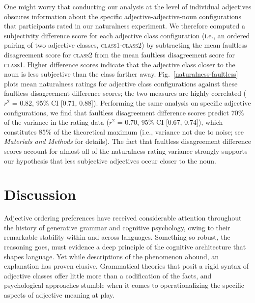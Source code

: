 \documentclass{pnastwo}
\begin{document}
\begin{article}
One might worry that conducting our analysis at the level of individual adjectives obscures information about the specific adjective-adjective-noun configurations that participants rated in our naturalness experiment.
We therefore computed a subjectivity difference score for each adjective class configuration (i.e., an ordered pairing of two adjective classes, \textsc{class1}-\textsc{class2}) by subtracting the mean faultless disagreement score for \textsc{class2} from the mean faultless disagreement score for \textsc{class1}. Higher difference scores indicate that the adjective class closer to the noun is less subjective than the class farther away. Fig.~\ref{naturalness-faultless} plots mean naturalness ratings for adjective class configurations against these faultless disagreement difference scores; the two measures are highly correlated ($r^2$ = 0.82, 95\% CI [0.71, 0.88]). Performing the same analysis on specific adjective configurations, we find that faultless disagreement difference scores predict 70\% of the variance in the rating data ($r^2$ = 0.70, 95\% CI [0.67, 0.74]), which constitutes 85\% of the theoretical maximum (i.e., variance not due to noise; see \emph{Materials and Methods} for details). The fact that faultless disagreement difference scores account for almost all of the naturalness rating variance strongly supports our hypothesis that less subjective adjectives occur closer to the noun. 

\section{Discussion}

Adjective ordering preferences have received considerable attention throughout the history of generative grammar and cognitive psychology, owing to their remarkable stability within and across languages. Something so robust, the reasoning goes, must evidence a deep principle of the cognitive architecture that shapes language. Yet while descriptions of the phenomenon abound, an explanation has proven elusive. Grammatical theories that posit a rigid syntax of adjective classes offer little more than a codification of the facts, and psychological approaches stumble when it comes to operationalizing the specific aspects of adjective meaning at play. 


\end{article}
\end{document}
